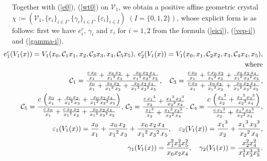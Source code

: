 \begin{thm}
Together with 
(\ref{e0}), (\ref{wt0}) on ${{\mathcal V}}_1$, we obtain a
positive affine geometric crystal $\chi:=
({{\mathcal V}}_1,\{e_i\}_{i\in I},
\{\gamma_i\}_{i\in I},\{{\varepsilon}_i\}_{i\in I})$
$(I=\{0,1,2\})$, whose explicit form is as follows:
first we have $e_i^c$, $\gamma_i$ and ${\varepsilon}_i$
for $i=1,2$ from the formula (\ref{eici}), (\ref{vep-i})
and (\ref{gamma-i}).
\begin{eqnarray*}
&&\hspace{-30pt}
e_1^c(V_1(x))=V_1(x_0,{{\mathcal C}}_1x_1,x_2,{{\mathcal C}}_3x_3,x_4,{{\mathcal C}}_5x_5),\,
e_2^c(V_1(x))=V_1(x_0,x_1,{{\mathcal C}}_2x_2,x_3,{{\mathcal C}}_4x_4,x_5),\\
&&\text{where}\\
&&{{\mathcal C}}_1=\frac{\frac{c\,{x_0}}{{x_1}} 
+ \frac{{x_0}\,{{x_2}}}{{{x_1}}^2\,{x_3}} 
+\frac{{x_0}\,{{x_2}}\,{{x_4}}}{{{x_1}}^2\,
{{x_3}}^2\,{x_5}}}{\frac{{x_0}}{{x_1}} 
+ \frac{{x_0}\,{{x_2}}}{{{x_1}}^2\,{x_3}} + 
\frac{{x_0}\,{{x_2}}\,
{{x_4}}}{{{x_1}}^2\,{{x_3}}^2\,{x_5}}},{\quad}
{{\mathcal C}}_3=\frac{\frac{c\,{x_0}}{{x_1}} 
+ \frac{c\,{x_0}\,{{x_2}}}{{{x_1}}^2\,{x_3}} + 
\frac{{x_0}\,{{x_2}}\,{{x_4}}}{{{x_1}}^2
\,{{x_3}}^2\,{x_5}}}{
\frac{c\,{x_0}}{{x_1}} 
+ \frac{{x_0}\,{{x_2}}}{{{x_1}}^2\,{x_3}} + 
\frac{{x_0}\,{{x_2}}\,{{x_4}}}
{{{x_1}}^2\,{{x_3}}^2\,{x_5}}},\\
&&{{\mathcal C}}_5=\frac{c\,\left( \frac{{x_0}}{{x_1}} + 
      \frac{{x_0}\,{{x_2}}}{{{x_1}}^2\,{x_3}} + 
\frac{{x_0}\,{{x_2}}\,{{x_4}}}{{{x_1}}^2
\,{{x_3}}^2\,{x_5}} \right)}{\frac{c\,{x_0}}{{x_1}} 
+ \frac{c\,{x_0}\,{{x_2}}}{{{x_1}}^2\,{x_3}} + 
\frac{{x_0}\,{{x_2}}\,{{x_4}}}
{{{x_1}}^2\,{{x_3}}^2\,{x_5}}},\,
{{\mathcal C}}_2=\frac{\frac{c\,{x_1}^3}{{x_2}} 
+ \frac{{x_1}^3\,{x_3}^3}{{{x_2}}^2\,{x_4}}}
{\frac{{x_1}^3}{{x_2}} + \frac{{x_1}^3\,{x_3}^3}{{{x_2}}^2\,{x_4}}},\,
{{\mathcal C}}_4=\frac{c\,\left( \frac{{x_1}^3}{{x_2}} + 
\frac{{x_1}^3\,{x_3}^3}{{{x_2}}^2\,{x_4}} \right) }{\frac{c\,{x_1}^3}
{{x_2}} + \frac{{x_1}^3\,{x_3}^3}{{{x_2}}^2\,{x_4}}},\\
&&{\varepsilon}_1(V_1(x))={\frac{{x_0}}{{x_1}} 
+ \frac{{x_0}\,{{x_2}}}{{{x_1}}^2\,{x_3}} + 
\frac{{x_0}\,{{x_2}}\,
{{x_4}}}{{{x_1}}^2\,{{x_3}}^2\,{x_5}}},{\quad}
{\varepsilon}_2(V_1(x))={\frac{{x_1}^3}{{x_2}} 
+ \frac{{x_1}^3\,{x_3}^3}{{{x_2}}^2\,{x_4}}},\\
&&\gamma_1(V_1(x))=\frac{x_1^2x_3^2x_5^2}{x_0x_2x_4},{\quad}
\gamma_2(V_1(x))=\frac{x_2^2x_4^2}{x_1^3x_3^3x_5^3}.
\end{eqnarray*}

\end{thm}
